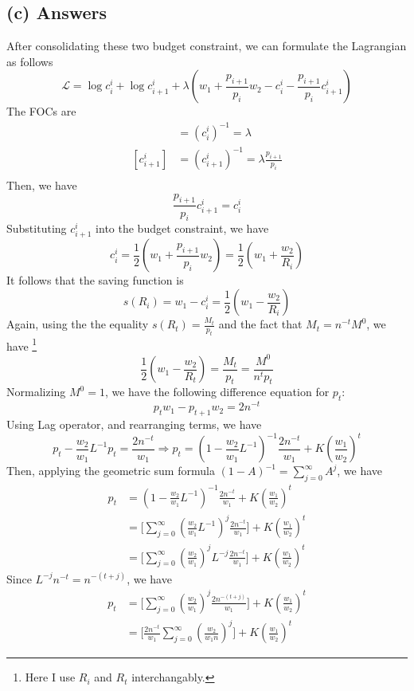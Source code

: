 \documentclass[11pt]{article}
\theoremstyle{definition}
\theoremstyle{boldtitle} %
\numberwithin{equation}{section}
\numberwithin{figure}{section}
\numberwithin{table}{section}
\begin{document}
\subsection{(c) Answers}
After consolidating these two budget constraint, we can formulate the Lagrangian as follows
\[
\mathcal{L} = \log c^i_i + \log c^{i}_{i+1} + \lambda ( w_1 + \frac{p_{i+1}}{p_i} w_2 - c^i_i - \frac{p_{i+1}}{p_i} c^{i}_{i+1})
\]
The FOCs are 
\begin{align*}
    [c^i_i] & = {(c^i_i)}^{-1} = \lambda \\ 
    [c^i_{i+1}] & = {(c^i_{i+1})}^{-1} = \lambda \frac{p_{i+1}}{p_i} \\ 
\end{align*}
Then, we have 
\[
\frac{p_{i+1}}{p_i} c^{i}_{i+1} = c_i^i 
\]
Substituting $c_{i+1}^i$ into the budget constraint, we have 
\[
c_i^i = \frac{1}{2} \left( w_1 + \frac{p_{i+1}}{p_i} w_2 \right) = \frac{1}{2} \left( w_1 + \frac{w_2}{R_i} \right)
\]
It follows that the saving function is 
\[
s(R_i) = w_1 - c_i^i = \frac{1}{2} \left( w_1 - \frac{w_2}{R_i} \right)
\]
Again, using the the equality $s(R_t) = \frac{M_t}{p_t}$ and the fact that $M_t = n^{-t}M^0$, we have%
\footnote{Here I use $R_i$ and $R_t$ interchangably.}
\[
\frac{1}{2} \left( w_1 - \frac{w_2}{R_t} \right) = \frac{M_t}{p_t} = \frac{M^0}{n^t p_t} 
\]
Normalizing $M^0 = 1$, we have the following difference equation for $p_t$:
\[
p_t w_1 - p_{t+1} w_2 = 2n^{-t}
\]
Using Lag operator, and rearranging terms, we have 
\[
p_t  - \frac{w_2}{w_1} L^{-1}  p_t = \frac{2n^{-t}}{w_1} \Rightarrow p_t = \left(1 - \frac{w_2}{w_1} L^{-1}\right)^{-1} \frac{2n^{-t}}{w_1} + K \left( \frac{w_1}{w_2}\right)^t
\]
Then, applying the geometric sum formula $(1 - A)^{-1} = \sum_{j = 0}^\infty A^j$, we have 
\begin{align*}
    p_t & = \left(1 - \frac{w_2}{w_1} L^{-1}\right)^{-1} \frac{2n^{-t}}{w_1} + K \left( \frac{w_1}{w_2}\right)^t\\ 
        & = \bigg[\sum_{j=0}^\infty \left(\frac{w_2}{w_1} L^{-1} \right)^j \frac{2n^{-t}}{w_1} \bigg] + K \left( \frac{w_1}{w_2}\right)^t\\
        & = \bigg[\sum_{j=0}^\infty \left(\frac{w_2}{w_1}\right)^j L^{-j}  \frac{2n^{-t}}{w_1} \bigg] + K \left( \frac{w_1}{w_2}\right)^t
\end{align*}
Since $L^{-j} n^{-t} = n^{-(t+j)}$, we have 
\begin{align*}
    p_t & = \bigg[\sum_{j=0}^\infty \left(\frac{w_2}{w_1}\right)^j \frac{2n^{-(t+j)}}{w_1} \bigg] + K \left( \frac{w_1}{w_2}\right)^t \\
        & = \bigg[\frac{2n^{-t}}{w_1}  \sum_{j=0}^\infty \left(\frac{w_2}{w_1 n}\right)^j \bigg] + K \left( \frac{w_1}{w_2}\right)^t
\end{align*}
\end{document}
